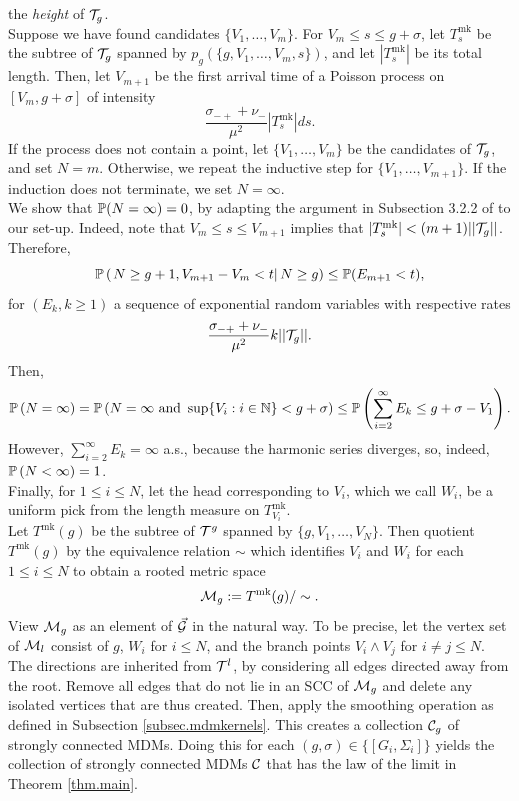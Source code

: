 the \emph{height} of $\cT_g$. \\
Suppose we have found candidates $\{V_1,\dots,V_m\}$. For $V_m\leq s\leq g+\sigma$, let $T^{\mathrm{mk}}_s$ be the subtree of $\cT_g$ spanned by $p_g\left(\{g,V_1,\dots,V_m,s\}\right)$, and let $|T^{\mathrm{mk}}_s|$ be its total length. Then, let $V_{m+1}$ be the first arrival time of a Poisson process on $[V_m,g+\sigma]$ of intensity $$\frac{\sigma_{-+}+\nu_-}{\mu^2}|T^{\mathrm{mk}}_s|ds.$$ If the process does not contain a point, let $\{V_1,\dots,V_m\}$ be the candidates of $\cT_g$, and set $N=m$. Otherwise, we repeat the inductive step for $\{V_1,\dots,V_{m+1}\}.$ If the induction does not terminate, we set $N=\infty$.\\
We show that $\P(N=\infty)=0$, by adapting the argument in Subsection 3.2.2 of \cite{goldschmidtScalingLimitCritical2019} to our set-up. Indeed, note that $V_m\leq s\leq V_{m+1}$ implies that  $|T^{\mathrm{mk}}_s|<(m+1)||\cT_g||$. Therefore, 
$$\P\left(\left.N\geq g+1,V_{m+1}-V_m<t \right|N\geq g\right)\leq \P(E_{m+1}<t),$$
for $(E_{k},k\geq 1)$ a sequence of exponential random variables with respective rates $$\frac{\sigma_{-+}+\nu_-}{\mu^2}k||\cT_g||.$$ 
Then,
$$\P\left(N=\infty \right)=\P\left(N=\infty\text{ and }\sup\{V_i:i\in \N\}<g+\sigma\right)\leq \P\left(\sum_{i=2}^\infty E_k\leq g+\sigma-V_1\right).$$
However, $\sum_{i=2}^\infty E_k=\infty$ a.s., because the harmonic series diverges, so, indeed, $\P\left(N<\infty \right)=1$. \\
Finally, for $1\leq i \leq N$, let the head corresponding to $V_i$, which we call $W_i$, be a uniform pick from the length measure on $T^{\mathrm{mk}}_{V_i}$. \\
Let $T^{\mathrm{mk}}(g)$ be the subtree of $\cT^{g}$ spanned by $\{g,V_1,\dots,V_N\}$. Then quotient $T^{\mathrm{mk}}(g)$ by the equivalence relation $\sim$ which identifies  $V_i$ and $W_i$ for each $1\leq i\leq N$ to obtain a rooted metric space $$\cM_{g}:=T^{\mathrm{mk}}(g)/\sim.$$ 
View $\cM_{g}$ as an element of $\vec{\cG}$ in the natural way. To be precise,  let the vertex set of $\cM_l$ consist of $g$, $W_i$ for $i\leq N$, and the branch points $V_i\wedge V_j$ for $i\neq j\leq N$. The directions are inherited from $\cT^l$, by considering all edges directed away from the root. Remove all edges that do not lie in an SCC of $\cM_{g}$ and delete any isolated vertices that are thus created. Then, apply the smoothing operation as defined in Subsection \ref{subsec.mdmkernels}. This creates a collection $\cC_g$ of strongly connected MDMs. Doing this for each $(g,\sigma)\in \{[G_i,\Sigma_i]\}$ yields the collection of strongly connected MDMs $\cC$ that has the law of the limit in Theorem \ref{thm.main}.

